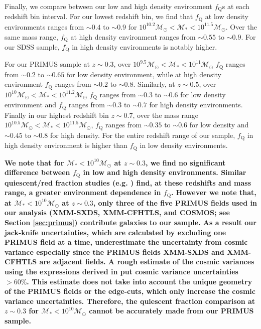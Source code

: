 \documentclass{emulateapj}
\begin{document}

Finally, we compare between our low and high density environment
$f_{\mathrm{Q}}$s at each redshift bin interval. For our lowest redshift
bin, we find that $f_{\mathrm{Q}}$ at low density environments ranges from
$\sim 0.4$ to $\sim 0.9$ for $10^{10.2} \mathcal{M}_{\odot} <
\mathcal{M}_{*} < 10^{11.5} \mathcal{M}_{\odot}$. Over the same mass
range, $f_{\mathrm{Q}}$ at high density environment ranges from $\sim
0.55$ to $\sim 0.9$. For our SDSS sample, $f_{\mathrm{Q}}$ in
high density environments is notably higher. 

For our PRIMUS sample at $z \sim 0.3$, over $10^{9.5} \mathcal{M}_{\odot} < \mathcal{M}_{*} < 10^{11} \mathcal{M}_{\odot}$ $f_{\mathrm{Q}}$ ranges from $\sim 0.2$ to $\sim 0.65$ for low density environment, while at high density environment $f_{\mathrm{Q}}$ ranges from $\sim 0.2$ to $\sim 0.8$. Similarly, at $z \sim 0.5$, over $10^{10} \mathcal{M}_{\odot} < \mathcal{M}_{*} < 10^{11.2} \mathcal{M}_{\odot}$ $f_{\mathrm{Q}}$ ranges from $\sim 0.3$ to $\sim 0.6$ for low density environment and $f_{\mathrm{Q}}$ ranges from $\sim 0.3$ to $\sim 0.7$ for high density environments. Finally in our highest redshift bin $z \sim 0.7$, over the mass range $10^{10.5} \mathcal{M}_{\odot} < \mathcal{M}_{*} < 10^{11.5} \mathcal{M}_{\odot}$, $f_{\mathrm{Q}}$ ranges from $\sim 0.35$ to $\sim 0.6$ for low density and $\sim 0.45$ to $\sim 0.8$ for high density. For the entire redshift range of our sample, $f_{\mathrm{Q}}$ in high density environment is higher than $f_{\mathrm{Q}}$ in low density environments. 

{\bf We note that for $\mathcal{M}_* < 10^{10} \mathcal{M}_{\odot}$ at $z \sim 0.3$, we find no significant difference between $f_\mathrm{Q}$ in low and high density environments. Similar quiescent/red fraction studies (e.g. \citealt{Baldry:2006aa, Cucciati:2010aa}) find, at these redshifts and mass range, a greater environment dependence in $f_\mathrm{Q}$. However we note that, at $\mathcal{M}_* < 10^{10} \mathcal{M}_{\odot}$ at $z \sim 0.3$, only three of the five PRIMUS fields used in our analysis (XMM-SXDS, XMM-CFHTLS, and COSMOS; see Section \ref{sec:primus}) contribute galaxies to our sample. As a result our jack-knife uncertainties, which are calculated by excluding one PRIMUS field at a time, underestimate the uncertainty from cosmic variance especially since the PRIMUS fields XMM-SXDS and XMM-CFHTLS are adjacent fields. A rough estimate of the cosmic variances using the expressions derived in \cite{Driver:2010aa} put cosmic variance uncertainties $> 60 \%$. This estimate does not take into account the unique geometry of the PRIMUS fields or the edge-cuts, which only increase the cosmic variance uncertainties. Therefore, the quiescent fraction comparison at $z \sim 0.3$ for $\mathcal{M}_{*} < 10^{10} \mathcal{M}_\odot$ cannot be accurately made from our PRIMUS sample.}
\end{document}
